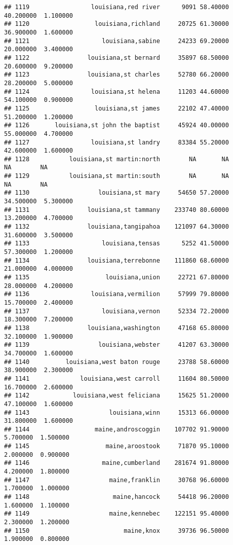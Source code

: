 \documentclass[
]{article}
\begin{document}
\begin{verbatim}
## 1119                 louisiana,red river      9091 58.40000 40.200000  1.100000
## 1120                  louisiana,richland     20725 61.30000 36.900000  1.600000
## 1121                    louisiana,sabine     24233 69.20000 20.000000  3.400000
## 1122                louisiana,st bernard     35897 68.50000 20.600000  9.200000
## 1123                louisiana,st charles     52780 66.20000 28.200000  5.000000
## 1124                 louisiana,st helena     11203 44.60000 54.100000  0.900000
## 1125                  louisiana,st james     22102 47.40000 51.200000  1.200000
## 1126       louisiana,st john the baptist     45924 40.00000 55.000000  4.700000
## 1127                 louisiana,st landry     83384 55.20000 42.600000  1.600000
## 1128           louisiana,st martin:north        NA       NA        NA        NA
## 1129           louisiana,st martin:south        NA       NA        NA        NA
## 1130                   louisiana,st mary     54650 57.20000 34.500000  5.300000
## 1131                louisiana,st tammany    233740 80.60000 13.200000  4.700000
## 1132                louisiana,tangipahoa    121097 64.30000 31.600000  3.500000
## 1133                    louisiana,tensas      5252 41.50000 57.300000  1.200000
## 1134                louisiana,terrebonne    111860 68.60000 21.000000  4.000000
## 1135                     louisiana,union     22721 67.80000 28.000000  4.200000
## 1136                 louisiana,vermilion     57999 79.80000 15.700000  2.400000
## 1137                    louisiana,vernon     52334 72.20000 18.300000  7.200000
## 1138                louisiana,washington     47168 65.80000 32.100000  1.900000
## 1139                   louisiana,webster     41207 63.30000 34.700000  1.600000
## 1140          louisiana,west baton rouge     23788 58.60000 38.900000  2.300000
## 1141              louisiana,west carroll     11604 80.50000 16.700000  2.600000
## 1142            louisiana,west feliciana     15625 51.20000 47.100000  1.600000
## 1143                      louisiana,winn     15313 66.00000 31.800000  1.600000
## 1144                  maine,androscoggin    107702 91.90000  5.700000  1.500000
## 1145                     maine,aroostook     71870 95.10000  2.000000  0.900000
## 1146                    maine,cumberland    281674 91.80000  4.200000  1.800000
## 1147                      maine,franklin     30768 96.60000  1.700000  1.000000
## 1148                       maine,hancock     54418 96.20000  1.600000  1.100000
## 1149                      maine,kennebec    122151 95.40000  2.300000  1.200000
## 1150                          maine,knox     39736 96.50000  1.900000  0.800000

\end{verbatim}
\end{document}
